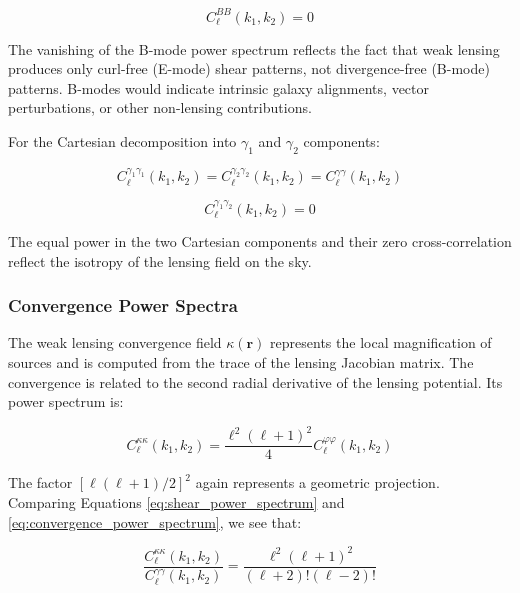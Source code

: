 \begin{equation}
C_\ell^{BB}(k_1, k_2) = 0
\label{eq:b_mode_power}
\end{equation}

The vanishing of the B-mode power spectrum reflects the fact that weak lensing produces only curl-free (E-mode) shear patterns, not divergence-free (B-mode) patterns. B-modes would indicate intrinsic galaxy alignments, vector perturbations, or other non-lensing contributions.

For the Cartesian decomposition into $\gamma_1$ and $\gamma_2$ components:

\begin{equation}
C_\ell^{\gamma_1\gamma_1}(k_1, k_2) = C_\ell^{\gamma_2\gamma_2}(k_1, k_2) = C_\ell^{\gamma\gamma}(k_1, k_2)
\label{eq:cartesian_shear_powers}
\end{equation}

\begin{equation}
C_\ell^{\gamma_1\gamma_2}(k_1, k_2) = 0
\label{eq:shear_cross_term}
\end{equation}

The equal power in the two Cartesian components and their zero cross-correlation reflect the isotropy of the lensing field on the sky.

\subsubsection{Convergence Power Spectra}

The weak lensing convergence field $\kappa(\mathbf{r})$ represents the local magnification of sources and is computed from the trace of the lensing Jacobian matrix. The convergence is related to the second radial derivative of the lensing potential. Its power spectrum is:

\begin{equation}
C_\ell^{\kappa\kappa}(k_1, k_2) = \frac{\ell^2(\ell+1)^2}{4} C_\ell^{\varphi\varphi}(k_1, k_2)
\label{eq:convergence_power_spectrum}
\end{equation}

The factor $[\ell(\ell+1)/2]^2$ again represents a geometric projection. Comparing Equations \ref{eq:shear_power_spectrum} and \ref{eq:convergence_power_spectrum}, we see that:

\begin{equation}
\frac{C_\ell^{\kappa\kappa}(k_1, k_2)}{C_\ell^{\gamma\gamma}(k_1, k_2)} = \frac{\ell^2(\ell+1)^2}{(\ell + 2)!(\ell - 2)!}
\label{eq:convergence_shear_ratio}
\end{equation}

